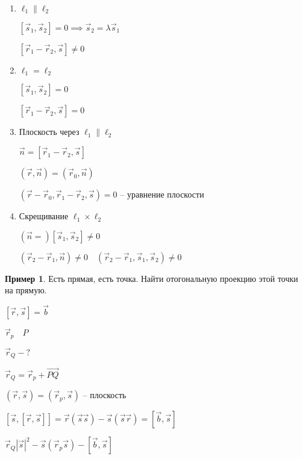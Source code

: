 \documentclass{book}
\theoremstyle{definition}
\newtheorem*{example}{Пример}
\newcommand\vect[1]{\overset{\longrightarrow}{#1}}
\begin{document}
\begin{enumerate}
    \item $\ell_1 \parallel \ell_2  $

        $\left[ \vec s_1, \vec s_2 \right] = 0 \implies \vec s_2 = \lambda \vec s_1$

        $\left[ \vec r_1-\vec r_2, \vec s \right] \neq 0$ 
    \item $\ell_1 = \ell_2  $

        $[\vec s_1, \vec s_2] = 0$

        $\left[ \vec r_1-\vec r_2, \vec s \right] = 0$

    \item [] Плоскость через $\ell_1 \parallel \ell_2 $

        $\vec n = \left[ \vec r_1-\vec r_2, \vec s\right] $

        $\left( \vec r, \vec n \right)  = \left( \vec r_0, \vec n \right) $

        $\left( \vec r-\vec r_0, \vec r_1-\vec r_2, \vec s \right) = 0$ -- уравнение плоскости
    \item Скрещивание $\ell_1 \times \ell_2 $

        $(\vec n = ) \left[ \vec s_1, \vec s_2 \right] \neq 0$ 

        $\left( \vec r_2-\vec r_1, \vec n \right) \neq 0\quad \left( \vec r_2-\vec r_1, \vec s_1, \vec s_2 \right) \neq 0$
\end{enumerate}

\begin{example}
    Есть прямая, есть точка. Найти отогональную проекцию этой точки на прямую.


    $[\vec r, \vec s] = \vec b$

    $\vec r_p\quad P$

     $\vec r_Q -?$

     $\vec r_Q = \vec r_p + \vect{PQ}$

     $(\vec r, \vec s) = (\vec r_p, \vec s)$ -- плоскость

     $\left[ \vec s, \left[ \vec r, \vec s \right]  \right]  = \vec r(\vec s \vec s) - \vec s(\vec s \vec r) = \left[ \vec b, \vec s \right]  $ 

     $\vec r_Q\left| \vec s \right| ^2 - \vec s\left( \vec r_p\vec s \right) - \left[ \vec b, \vec s \right] $
\end{example}
\end{document}
